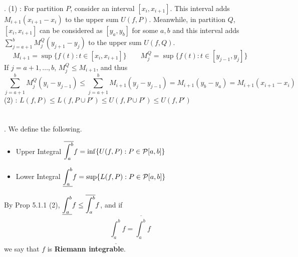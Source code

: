 \pf. (1) : For partition $P$, consider an interval $[x_{i}, x_{i+1}]$. This interval adds $M_{i+1}(x_{i+1}-x_i)$ to the upper sum $U(f, P)$. Meanwhile, in partition $Q$, $[x_i, x_{i+1}]$ can be considered as $[y_a, y_b]$ for some $a, b$ and this interval adds $\sum_{j=a+1}^b M_{j}^Q(y_{j+1}-y_j)$ to the upper sum $U(f, Q)$.\\
$$M_{i+1} =\sup\{f(t): t\in [x_i, x_{i+1}]\} \qquad M_{j}^Q = \sup\{f(t): t\in [y_{j-1}, y_j] \}$$
If $j = a+1, \dots, b$, $M_{j}^Q\leq M_{i+1}$, and thus
$$
	\sum_{j=a+1}^b M_j^Q (y_i-y_{j-1}) \leq \sum_{j=a+1}^b M_{i+1}(y_j - y_{j-1}) = M_{i+1}(y_b-y_a) = M_{i+1}(x_{i+1}-x_i)
$$
(2) : $L(f, P)\leq L(f, P\cup P') \leq U(f, P\cup P') \leq U(f, P')$\\
\\
\\
. We define the following.
\begin{itemize}
	\item Upper Integral $\displaystyle \overline{\int_a^b} f = \inf\{U(f, P): P\in \mathcal{P}[a, b] \}$
	\item Lower Integral $\displaystyle \underline{\int_a^b} f = \sup\{L(f, P): P\in \mathcal{P}[a, b] \}$
\end{itemize}
By Prop 5.1.1 (2), $\displaystyle \underline{\int_a^b} f \leq \overline{\int_a^b} f$, and if $$\underline{\int_a^b}f = \overline{\int_a^b}f$$
we say that $f$ is \textbf{Riemann integrable}.
\pagebreak